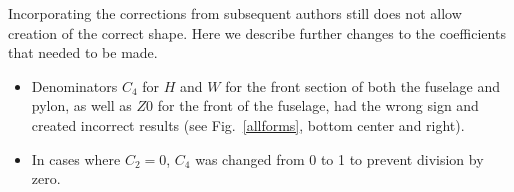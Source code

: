 \documentclass[journal]{new-aiaa}
\begin{document}

Incorporating the corrections from subsequent authors still does not allow creation of the correct shape.
Here we describe further changes to the coefficients that needed to be made.
\begin{itemize}
\item Denominators $C_{4}$ for $H$ and $W$ for the front section of both the fuselage and pylon, as well as $Z0$ for the
front of the fuselage, had the wrong sign and created incorrect results (see Fig.~\ref{allforms}, bottom center and right).
\item In cases where $C_{2}=0$, $C_{4}$ was changed from 0 to 1 to prevent division by zero.
\end{itemize}

\end{document}
